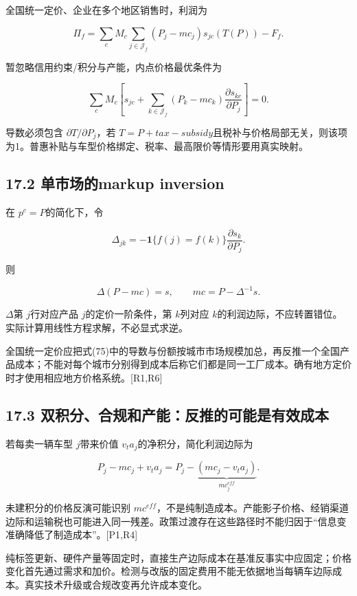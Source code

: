 \documentclass[
  11pt,
]{article}
\begin{document}
全国统一定价、企业在多个地区销售时，利润为

\[
\Pi_f=\sum_c M_c\sum_{j\in\mathcal J_f}
(P_j-mc_j)s_{jc}(T(P))-F_f.
\tag{73}
\]

暂忽略信用约束/积分与产能，内点价格最优条件为

\[
\sum_cM_c\left[
 s_{jc}+\sum_{k\in\mathcal J_f}
(P_k-mc_k)\frac{\partial s_{kc}}{\partial P_j}
\right]=0.
\tag{74}
\]

导数必须包含 \(\partial T/\partial P_j\)，若
\(T=P+tax-subsidy\)且税补与价格局部无关，则该项为1。普惠补贴与车型价格绑定、税率、最高限价等情形要用真实映射。

\subsection{17.2 单市场的markup
inversion}\label{ux5355ux5e02ux573aux7684markup-inversion}

在 \(p^c=P\)的简化下，令

\[
\Delta_{jk}=-\mathbf1\{f(j)=f(k)\}
\frac{\partial s_k}{\partial P_j}.
\tag{75}
\]

则

\[
\Delta(P-mc)=s,\qquad
\boxed{mc=P-\Delta^{-1}s.}
\tag{76}
\]

\(\Delta\)第 \(j\)行对应产品 \(j\)的定价一阶条件，第 \(k\)列对应
\(k\)的利润边际，不应转置错位。实际计算用线性方程求解，不必显式求逆。

全国统一定价应把式(75)中的导数与份额按城市市场规模加总，再反推一个全国产品成本；不能对每个城市分别得到成本后称它们都是同一工厂成本。确有地方定价时才使用相应地方价格系统。{[}R1,R6{]}

\subsection{17.3
双积分、合规和产能：反推的可能是有效成本}\label{ux53ccux79efux5206ux5408ux89c4ux548cux4ea7ux80fdux53cdux63a8ux7684ux53efux80fdux662fux6709ux6548ux6210ux672c}

若每卖一辆车型 \(j\)带来价值 \(v_t a_j\)的净积分，简化利润边际为

\[
P_j-mc_j+v_ta_j=P_j-\underbrace{(mc_j-v_ta_j)}_{mc_j^{eff}}.
\tag{77}
\]

未建积分的价格反演可能识别
\(mc^{eff}\)，不是纯制造成本。产能影子价格、经销渠道边际和运输税也可能进入同一残差。政策过渡存在这些路径时不能归因于``信息变准确降低了制造成本''。{[}P1,R4{]}

纯标签更新、硬件产量等固定时，直接生产边际成本在基准反事实中应固定；价格变化首先通过需求和加价。检测与改版的固定费用不能无依据地当每辆车边际成本。真实技术升级或合规改变再允许成本变化。
\end{document}

